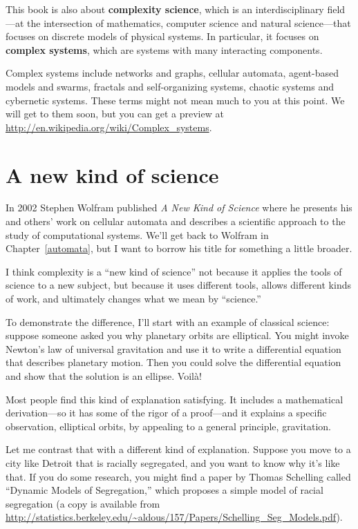 \documentclass[10pt]{book}
\begin{document}
This book is also about {\bf complexity science}, which is an
interdisciplinary field---at the intersection of mathematics, computer
science and natural science---that focuses on discrete models of
physical systems.  
In particular, it focuses on {\bf complex systems}, which are
systems with many interacting components.  

Complex systems include networks and graphs, cellular automata,
agent-based models and swarms, fractals and self-organizing
systems, chaotic systems and cybernetic systems.  These terms
might not mean much to you at this point.  We will get to them
soon, but you can get a preview at
\url{http://en.wikipedia.org/wiki/Complex_systems}.


\section{A new kind of science}

In 2002 Stephen Wolfram published {\em A New Kind of Science} where he
presents his and others' work on cellular automata and describes a
scientific approach to the study of computational systems.  We'll get
back to Wolfram in Chapter~\ref{automata}, but I want to borrow his
title for something a little broader.

I think complexity is a ``new kind of science'' not because
it applies the tools of science to a new subject, but because it
uses different tools, allows different kinds of work, and ultimately
changes what we mean by ``science.''

To demonstrate the difference, I'll start with an example of classical
science: suppose someone asked you why planetary orbits are
elliptical.  You might invoke Newton's law of universal
gravitation and use it to write a differential equation that describes
planetary motion.  Then you could solve the differential equation and
show that the solution is an ellipse.  Voil\`{a}!

Most people find this kind of explanation satisfying.  It includes a
mathematical derivation---so it has some of the rigor of a proof---and
it explains a specific observation, elliptical orbits, by appealing to
a general principle, gravitation.

Let me contrast that with a different kind of explanation.  Suppose
you move to a city like Detroit that is racially segregated, and you
want to know why it's like that.  If you do some research, you might
find a paper by Thomas Schelling called ``Dynamic Models of
Segregation,'' which proposes a simple model of racial segregation
(a copy is available from \url{http://statistics.berkeley.edu/~aldous/157/Papers/Schelling_Seg_Models.pdf}).
\end{document}
